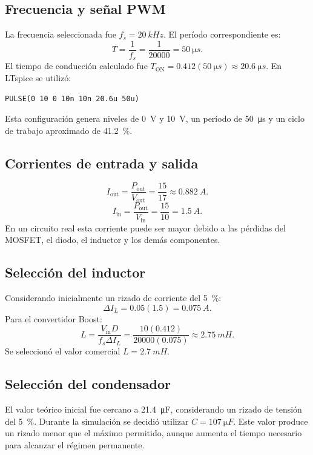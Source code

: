 \documentclass[12pt]{article}
\begin{document}
\subsection{Frecuencia y señal PWM}
La frecuencia seleccionada fue $f_s=\SI{20}{kHz}$. El período correspondiente es:
\begin{equation}
T=\frac{1}{f_s}=\frac{1}{20000}=\SI{50}{\micro s}.
\label{eq:periodo}
\end{equation}
El tiempo de conducción calculado fue $T_{\mathrm{ON}}=0.412(\SI{50}{\micro s})\approx\SI{20.6}{\micro s}$. En LTspice se utilizó:
\begin{verbatim}
PULSE(0 10 0 10n 10n 20.6u 50u)
\end{verbatim}
Esta configuración genera niveles de \SI{0}{V} y \SI{10}{V}, un período de \SI{50}{\micro s} y un ciclo de trabajo aproximado de \SI{41.2}{\percent}.

\subsection{Corrientes de entrada y salida}
\begin{equation}
I_{\mathrm{out}}=\frac{P_{\mathrm{out}}}{V_{\mathrm{out}}}=\frac{15}{17}\approx\SI{0.882}{A}.
\label{eq:iout}
\end{equation}
\begin{equation}
I_{\mathrm{in}}=\frac{P_{\mathrm{out}}}{V_{\mathrm{in}}}=\frac{15}{10}=\SI{1.5}{A}.
\label{eq:iin}
\end{equation}
En un circuito real esta corriente puede ser mayor debido a las pérdidas del MOSFET, el diodo, el inductor y los demás componentes.

\subsection{Selección del inductor}
Considerando inicialmente un rizado de corriente del \SI{5}{\percent}:
\[
\Delta I_L=0.05(1.5)=\SI{0.075}{A}.
\]
Para el convertidor Boost:
\begin{equation}
L=\frac{V_{\mathrm{in}}D}{f_s\Delta I_L}=\frac{10(0.412)}{20000(0.075)}\approx\SI{2.75}{mH}.
\label{eq:inductor}
\end{equation}
Se seleccionó el valor comercial $L=\SI{2.7}{mH}$.

\subsection{Selección del condensador}
El valor teórico inicial fue cercano a \SI{21.4}{\micro F}, considerando un rizado de tensión del \SI{5}{\percent}. Durante la simulación se decidió utilizar $C=\SI{107}{\micro F}$. Este valor produce un rizado menor que el máximo permitido, aunque aumenta el tiempo necesario para alcanzar el régimen permanente.
\end{document}
